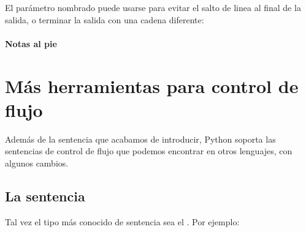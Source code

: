 \documentclass[a4,10pt,spanish]{sphinxmanual}
\begin{document}
\begin{itemize}
\begin{sphinxVerbatim}[commandchars=\\\{\}]
  
 
\end{sphinxVerbatim}

\sphinxAtStartPar
El parámetro nombrado  puede usarse para evitar el salto de linea al final de la salida, o terminar la salida con una cadena diferente:

\begin{sphinxVerbatim}[commandchars=\\\{\}]
    
   
     
        
\end{sphinxVerbatim}

\end{itemize}
\subsubsection*{Notas al pie}


\chapter{Más herramientas para control de flujo}
\label{\detokenize{tutorial/controlflow:more-control-flow-tools}}\label{\detokenize{tutorial/controlflow:tut-morecontrol}}\label{\detokenize{tutorial/controlflow::doc}}
\sphinxAtStartPar
Además de la sentencia  que acabamos de introducir, Python soporta las sentencias de control de flujo que podemos encontrar en otros lenguajes, con algunos cambios.


\section{La sentencia }
\label{\detokenize{tutorial/controlflow:if-statements}}\label{\detokenize{tutorial/controlflow:tut-if}}
\sphinxAtStartPar
Tal vez el tipo más conocido de sentencia sea el . Por ejemplo:
\end{document}
